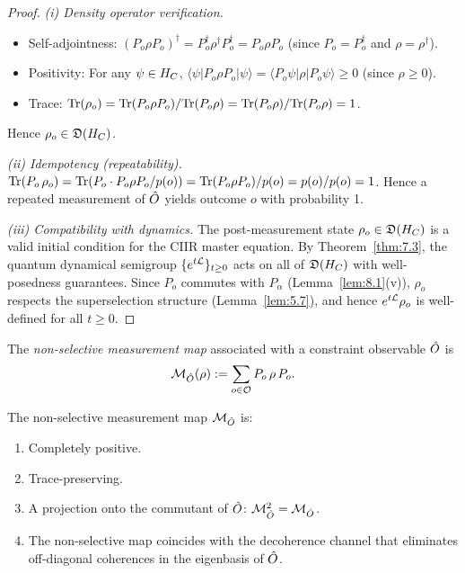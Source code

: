 \begin{proof}
\textit{(i) Density operator verification.}
\begin{itemize}
  \item Self-adjointness: $(P_o\rho P_o)^\dagger = P_o^\dagger
    \rho^\dagger P_o^\dagger = P_o\rho P_o$ (since $P_o = P_o^\dagger$
    and $\rho = \rho^\dagger$).
  \item Positivity: For any $\psi \in H_C$,
    $\langle\psi|P_o\rho P_o|\psi\rangle
    = \langle P_o\psi|\rho|P_o\psi\rangle \geq 0$
    (since $\rho \geq 0$).
  \item Trace: $\mathrm{Tr}(\rho_o) = \mathrm{Tr}(P_o\rho P_o)/\mathrm{Tr}(P_o\rho)
    = \mathrm{Tr}(P_o\rho)/\mathrm{Tr}(P_o\rho) = 1$.
\end{itemize}
Hence $\rho_o \in \mathfrak{D}(H_C)$.

\textit{(ii) Idempotency (repeatability).}
$\mathrm{Tr}(P_o\,\rho_o) = \mathrm{Tr}(P_o \cdot P_o\rho P_o / p(o))
= \mathrm{Tr}(P_o\rho P_o)/p(o) = p(o)/p(o) = 1$.
Hence a repeated measurement of $\hat{O}$ yields outcome $o$ with
probability 1.

\textit{(iii) Compatibility with dynamics.}
The post-measurement state $\rho_o \in \mathfrak{D}(H_C)$
is a valid initial condition for the CIIR master equation.
By Theorem~\ref{thm:7.3}, the quantum dynamical semigroup
$\{e^{t\mathcal{L}}\}_{t \geq 0}$ acts on all of $\mathfrak{D}(H_C)$
with well-posedness guarantees.  Since $P_o$ commutes with $P_\alpha$
(Lemma~\ref{lem:8.1}(v)), $\rho_o$ respects the superselection
structure (Lemma~\ref{lem:5.7}), and hence
$e^{t\mathcal{L}}\rho_o$ is well-defined for all $t \geq 0$.
\end{proof}

\begin{definition}
\label{def:8.8}
The \emph{non-selective measurement map} associated with a constraint
observable $\hat{O}$ is
\[
  \mathcal{M}_{\hat{O}}(\rho)
  := \sum_{o \in \mathcal{O}} P_o\,\rho\,P_o.
\]
\end{definition}

\begin{lemma}
\label{lem:8.4}
The non-selective measurement map $\mathcal{M}_{\hat{O}}$ is:
\begin{enumerate}
  \item[\textup{(i)}] Completely positive.
  \item[\textup{(ii)}] Trace-preserving.
  \item[\textup{(iii)}] A projection onto the commutant of $\hat{O}$:
    $\mathcal{M}_{\hat{O}}^2 = \mathcal{M}_{\hat{O}}$.
  \item[\textup{(iv)}] The non-selective map coincides with the
    decoherence channel that eliminates off-diagonal coherences in the
    eigenbasis of $\hat{O}$.
\end{enumerate}
\end{lemma}

